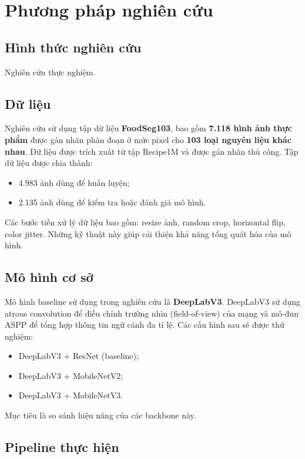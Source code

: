 \section{Phương pháp nghiên cứu}


\subsection{Hình thức nghiên cứu}

Nghiên cứu thực nghiệm.

\subsection{Dữ liệu}

Nghiên cứu sử dụng tập dữ liệu \textbf{FoodSeg103}, bao gồm \textbf{7.118 hình ảnh thực phẩm} được gán nhãn phân đoạn ở mức pixel cho \textbf{103 loại nguyên liệu khác nhau}. Dữ liệu được trích xuất từ tập Recipe1M và được gán nhãn thủ công. Tập dữ liệu được chia thành:
\begin{itemize}
    \item 4.983 ảnh dùng để huấn luyện;
    \item 2.135 ảnh dùng để kiểm tra hoặc đánh giá mô hình.
\end{itemize}

Các bước tiền xử lý dữ liệu bao gồm: resize ảnh, random crop, horizontal flip, color jitter. Những kỹ thuật này giúp cải thiện khả năng tổng quát hóa của mô hình.

\subsection{Mô hình cơ sở}

Mô hình baseline sử dụng trong nghiên cứu là \textbf{DeepLabV3}. DeepLabV3 sử dụng atrous convolution để điều chỉnh trường nhìn (field-of-view) của mạng và mô-đun ASPP để tổng hợp thông tin ngữ cảnh đa tỉ lệ. Các cấu hình sau sẽ được thử nghiệm:
\begin{itemize}
    \item DeepLabV3 + ResNet (baseline);
    \item DeepLabV3 + MobileNetV2;
    \item DeepLabV3 + MobileNetV3.
\end{itemize}
Mục tiêu là so sánh hiệu năng của các backbone này.

\subsection{Pipeline thực hiện}

